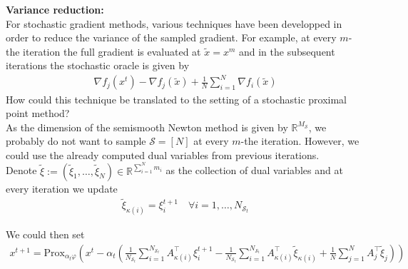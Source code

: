 \documentclass[12pt,a4paper,twoside]{article}
\theoremstyle{plain}
\theoremstyle{note}
\numberwithin{thm}{section}
\newcommand{\prox}[2]{\text{Prox}_{#1}\left(#2\right)}
\newcommand{\ixmap}[1]{{\kappa(#1)}}
\let\temp\phi
\let\phi\varphi
\let\varphi\temp
\begin{document}
	\vspace{10mm}
	\textbf{Variance reduction:}\\
	For stochastic gradient methods, various techniques have been developped in order to reduce the variance of the sampled gradient. For example, at every $m$-the iteration the full gradient is evaluated at $\tilde{x} = x^m$ and in the subsequent iterations the stochastic oracle is given by 
	\begin{align*}
		\nabla f_j(x^t) - \nabla f_j(\tilde{x}) + \frac{1}{N} \sum_{i=1}^{N} \nabla f_i(\tilde{x})
	\end{align*}
	How could this technique be translated to the setting of a stochastic proximal point method?\\
	As the dimension of the semismooth Newton method is given by $\mathbb{R}^{M_\mathcal{S}}$, we probably do not want to sample $\mathcal{S} = [N]$ at every $m$-the iteration. However, we could use the already computed dual variables from previous iterations.\\
	Denote $\tilde{\xi} := \left(\tilde{\xi}_1, \dots, \tilde{\xi}_N \right) \in \mathbb{R}^{\sum_{i=1}^{N} m_i}$ as the collection of dual variables and at every iteration we update 
	\begin{align*}
		\tilde{\xi}_{\kappa(i)} = \xi^{t+1}_i \quad \forall i = 1, \dots, N_{\mathcal{S}_t}
	\end{align*}
	
	We could then set 
	\begin{align*}
		x^{t+1} = \prox{\alpha_t \phi}{x^t - \alpha_t
			\left( \frac{1}{N_{\mathcal{S}_t}}\sum_{i=1}^{N_{\mathcal{S}_t}} A_\ixmap{i}^\intercal \xi_i^{t+1}  
					- \frac{1}{N_{\mathcal{S}_t}}\sum_{i=1}^{N_{\mathcal{S}_t}} A_\ixmap{i}^\intercal \tilde{\xi}_{\kappa(i)}
					+ \frac{1}{N}\sum_{j=1}^{N} A_j^\intercal \tilde{\xi}_{j}
			\right)
		}
	\end{align*}
	\vspace{10mm}
	
\end{document}
